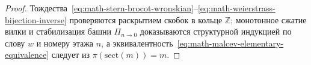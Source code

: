 \begin{proof}
\leanok
Тождества~\eqref{eq:math-stern-brocot-wronskian}--\eqref{eq:math-weierstrass-bijection-inverse} проверяются раскрытием скобок в кольце $\mathbb{Z}$; монотонное сжатие вилки и стабилизация башни $\Pi_{n\to 0}$ доказываются структурной индукцией по слову $w$ и номеру этажа $n$, а эквивалентность~\eqref{eq:math-malcev-elementary-equivalence} следует из $\pi(\mathrm{sect}(m)) = m$.
\end{proof}
